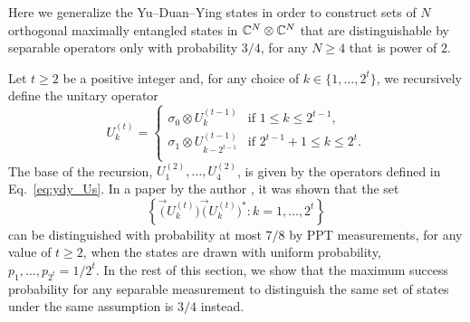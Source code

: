 Here we generalize the Yu--Duan--Ying states in order to construct sets of $N$ orthogonal 
maximally entangled states in $\mathbb{C}^{N}\otimes\mathbb{C}^{N}$ that are distinguishable
by separable operators only with probability $3/4$, for any $N \geq 4$ that is power of $2$. 

Let $t \geq 2$ be a positive integer and, for any choice of $k \in \{ 1, \ldots, 2^{t}\}$,
we recursively define the unitary operator
\begin{equation}
\label{eq:construction}
  U_{k}^{(t)} =
    \begin{cases}
      \sigma_{0}\otimes U_{k}^{(t-1)} &\mbox{if } 1 \leq k \leq 2^{t-1},\\
      \sigma_{1}\otimes U_{k-2^{t-1}}^{(t-1)} &\mbox{if } 2^{t-1} + 1 \leq k \leq 2^{t}.\\ 
    \end{cases}
\end{equation}
The base of the recursion, $U_{1}^{(2)}, \ldots, U_{4}^{(2)}$, 
is given by the operators defined in Eq.~\eqref{eq:ydy_Us}.
In a paper by the author \cite{Cosentino14}, it was shown that the set 
\begin{equation}
\label{eq:ydy_higher_dimension}
  \left\{ \vec(U_{k}^{(t)})\vec(U_{k}^{(t)})^{\ast} : k = 1, \ldots, 2^{t}\right\} 
\end{equation}
can be distinguished with probability at most $7/8$ by PPT measurements, 
for any value of $t \geq 2$, when the states are drawn with uniform probability, 
$p_{1}, \ldots, p_{2^{t}} = 1/2^{t}$.
In the rest of this section, we show that the maximum success probability for any separable 
measurement to distinguish the same set of states under the same assumption is $3/4$ instead.

